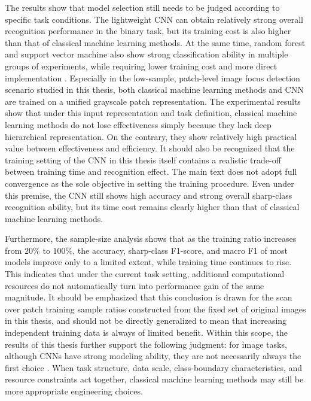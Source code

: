 \par The results show that model selection still needs to be judged according to
specific task conditions. The lightweight CNN can obtain relatively strong
overall recognition performance in the binary task, but its training cost is
also higher than that of classical machine learning methods. At the same time,
random forest and support vector machine also show strong classification ability
in multiple groups of experiments, while requiring lower training cost and more
direct implementation \cite{cortes1995support,breiman2001random}. Especially in the low-sample, patch-level image focus
detection scenario studied in this thesis, both classical machine learning
methods and CNN are trained on a unified grayscale patch representation. The
experimental results show that under this input representation and task
definition, classical machine learning methods do not lose effectiveness simply
because they lack deep hierarchical representation. On the contrary, they show
relatively high practical value between effectiveness and efficiency. It should
also be recognized that the training setting of the CNN in this thesis itself
contains a realistic trade-off between training time and recognition effect. The
main text does not adopt full convergence as the sole objective in setting the
training procedure. Even under this premise, the CNN still shows high accuracy
and strong overall sharp-class recognition ability, but its time cost remains
clearly higher than that of classical machine learning methods.

\par Furthermore, the sample-size analysis shows that as the training ratio
increases from $20\%$ to $100\%$, the accuracy, sharp-class F1-score, and macro
F1 of most models improve only to a limited extent, while training time
continues to rise. This indicates that under the current task setting,
additional computational resources do not automatically turn into performance
gain of the same magnitude. It should be emphasized that this conclusion is
drawn for the scan over patch training sample ratios constructed from the fixed
set of original images in this thesis, and should not be directly generalized to
mean that increasing independent training data is always of limited benefit.
Within this scope, the results of this thesis further support the following
judgment: for image tasks, although CNNs have strong modeling ability, they are
not necessarily always the first choice \cite{lecun2002gradient,krizhevsky2012imagenet,goodfellow2016deep}. When task structure, data scale,
class-boundary characteristics, and resource constraints act together, classical
machine learning methods may still be more appropriate engineering choices.

